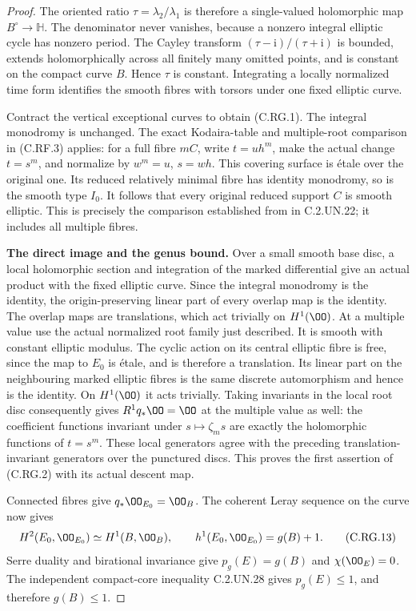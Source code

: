 \begin{proof}
The oriented ratio $\tau=\lambda_2/\lambda_1$ is
therefore a single-valued holomorphic map
$B^\circ\to\mathbb H$. The denominator never vanishes,
because a nonzero integral elliptic cycle has nonzero
period. The Cayley transform $(\tau-\mathrm i)/(\tau+\mathrm i)$
is bounded, extends holomorphically across all finitely
many omitted points, and is constant on the compact
curve $B$. Hence $\tau$ is constant. Integrating a
locally normalized time form identifies the smooth
fibres with torsors under one fixed elliptic curve.

Contract the vertical exceptional curves to obtain
(C.RG.1). The integral monodromy is unchanged. The
exact Kodaira-table and multiple-root comparison in
(C.RF.3) applies: for a full fibre $mC$, write
$t=u h^m$, make the actual change $t=s^m$, and
normalize by $w^m=u$, $s=wh$. This covering surface
is \'etale over the original one. Its reduced
relatively minimal fibre has identity monodromy,
so is the smooth type $I_0$. It follows that every
original reduced support $C$ is smooth elliptic.
This is precisely the comparison established from
\cite[Theorem~6.2 and Table~I]{Kodaira1963II} in
C.2.UN.22; it includes all multiple fibres.

\par\medskip\noindent\textbf{The direct image and the genus bound.}
Over a small smooth base disc, a local holomorphic
section and integration of the marked differential
give an actual product with the fixed elliptic curve.
Since the integral monodromy is the identity, the
origin-preserving linear part of every overlap map
is the identity. The overlap maps are translations,
which act trivially on $H^1(\OO)$.
At a multiple value use the actual normalized root
family just described. It is smooth with constant
elliptic modulus. The cyclic action on its central
elliptic fibre is free, since the map to $E_0$ is
\'etale, and is therefore a translation. Its linear
part on the neighbouring marked elliptic fibres
is the same discrete automorphism and hence is
the identity. On $H^1(\OO)$ it acts trivially.
Taking invariants in the local root disc consequently
gives $R^1q_*\OO=\OO$ at the multiple value as well:
the coefficient functions invariant under
$s\mapsto\zeta_m s$ are exactly the holomorphic
functions of $t=s^m$. These local generators agree
with the preceding translation-invariant generators
over the punctured discs. This proves the first
assertion of (C.RG.2) with its actual descent map.

Connected fibres give $q_*\OO_{E_0}=\OO_B$.
The coherent Leray sequence on the curve now gives
\[
 H^2(E_0,\OO_{E_0})\simeq H^1(B,\OO_B),\qquad
 h^1(E_0,\OO_{E_0})=g(B)+1.
                                                               \tag{C.RG.13}
\]
Serre duality and birational invariance give
$p_g(E)=g(B)$ and $\chi(\OO_E)=0$.
The independent compact-core inequality
C.2.UN.28 gives $p_g(E)\le1$, and therefore
$g(B)\le1$.


\end{proof}
